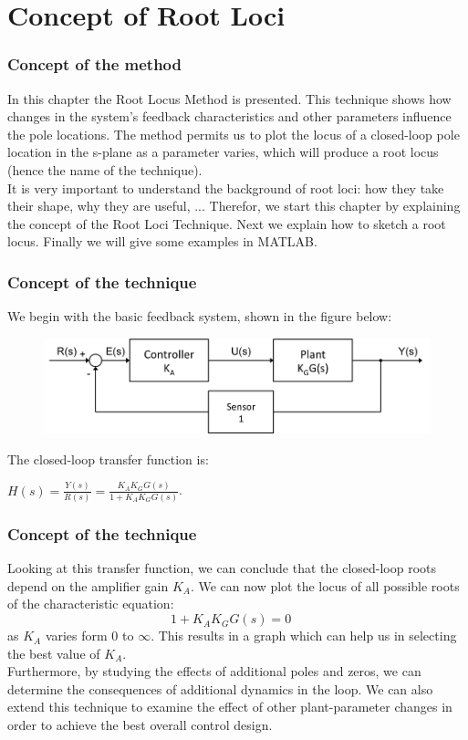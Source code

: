 \section{Concept of Root Loci}

\begin{frame}
\frametitle{Concept of the method}
In this chapter the Root Locus Method is presented. This technique shows how changes in the system's feedback characteristics and other parameters influence the pole locations. The method permits us to plot the locus of a closed-loop pole location in the s-plane as a parameter varies, which will produce a root locus (hence the name of the technique).\\
\vspace{1em}
It is very important to understand the background of root loci: how they take their shape, why they are useful, ... Therefor, we start this chapter by explaining the concept of the Root Loci Technique. Next we explain how to sketch a root locus. Finally we will give some examples in MATLAB.
\end{frame}

\begin{frame}
\frametitle{Concept of the technique}
	We begin with the basic feedback system, shown in the figure below:
	\begin{figure}
		\centering
		\includegraphics[width=1\linewidth]{closed_loop_diagram}
	\end{figure}
	The closed-loop transfer function is:
	\begin{center}
		$H(s) = \frac{Y(s)}{R(s)} = \frac{K_AK_GG(s)}{1 + K_AK_GG(s)}$.
	\end{center}
\end{frame}

\begin{frame}
\frametitle{Concept of the technique}
	Looking at this transfer function, we can conclude that the closed-loop roots depend on the amplifier gain $K_A$. We can now plot the locus of all possible roots of the characteristic equation: 
	\begin{equation}
		1 + K_AK_GG(s) = 0 \hspace{1em}
	\end{equation}
	as $K_A$ varies form $0$ to $\infty$. This results in a graph which can help us in selecting the best value of $K_A$.\\
	\vspace{1em}
	Furthermore, by studying the effects of additional poles and zeros, we can determine the consequences of additional dynamics in the loop. We can also extend this technique to examine the effect of other plant-parameter changes in order to achieve the best overall control design.
\end{frame}

